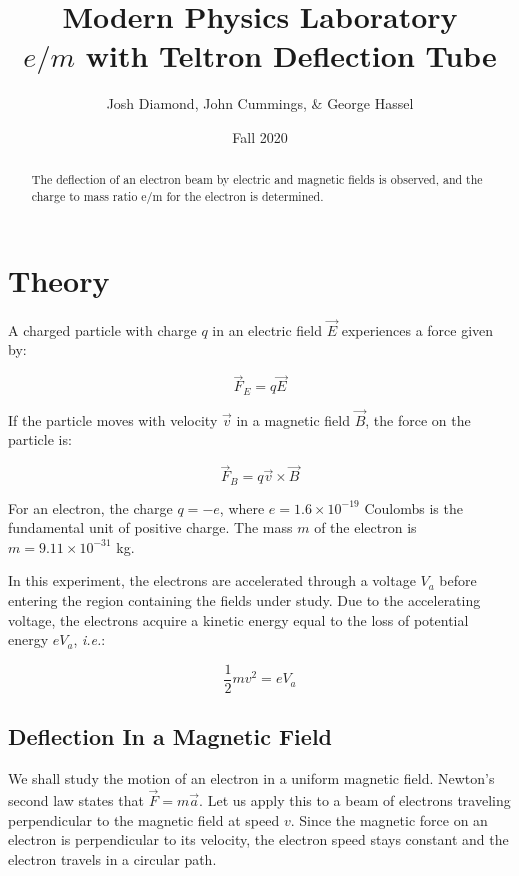 \documentclass{article}
\begin{document}
\title{Modern Physics Laboratory \\
$e/m$ with Teltron Deflection Tube}
\author{Josh Diamond,  John Cummings, \& George Hassel}
\date{Fall 2020 }
\maketitle

\begin{abstract}
The deflection of an electron beam by electric and magnetic fields is
observed, and the charge to mass ratio e/m for the electron is
determined.
\end{abstract}



\section{Theory}
A charged particle with charge $q$ in an electric field $\vec{E}$
experiences a force given by:

\begin{equation}
\vec{F}_E = q \vec{E}
\end{equation}


If the particle moves with velocity $\vec{v}$ in a
magnetic field $\vec{B}$, the force on the particle is:

\begin{equation}
\label{lorentz}
\vec{F}_B = q \vec{v} \times \vec{B}
\end{equation}

For an electron, the charge $q = -e$, where $e = 1.6 \times 10^{-19}$ Coulombs
is the fundamental unit of positive charge. The mass $m$ of the electron
is $m = 9.11 \times 10^{-31}$ kg.

In this experiment, the electrons are accelerated through a voltage
$V_a$ before entering the region containing the fields
under study. Due to the accelerating voltage, the electrons acquire a
kinetic energy equal to the loss of potential energy $eV_a$, {\em i.e.}:

\begin{equation}
\label{energy}
\frac{1}{2} mv^{2} = eV_a
\end{equation}

\subsection{Deflection In a Magnetic Field}

We shall study the motion of an electron in a uniform magnetic field.
Newton's second law states that $\vec{F} = m\vec{a}$. Let us apply
this to a beam of electrons traveling perpendicular to the magnetic
field at speed $v$. Since the magnetic force on an electron is
perpendicular to its velocity, the electron speed stays constant and
the electron travels in a circular path.
\end{document}
